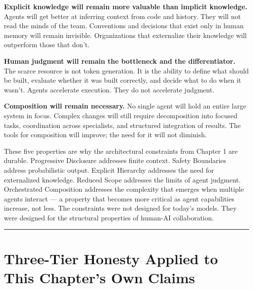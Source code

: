 \documentclass[
  a4paper,
  DIV=11,
  numbers=noendperiod]{scrreprt}
\begin{document}
\textbf{Explicit knowledge will remain more valuable than implicit
knowledge.} Agents will get better at inferring context from code and
history. They will not read the minds of the team. Conventions and
decisions that exist only in human memory will remain invisible.
Organizations that externalize their knowledge will outperform those
that don't.

\textbf{Human judgment will remain the bottleneck and the
differentiator.} The scarce resource is not token generation. It is the
ability to define what should be built, evaluate whether it was built
correctly, and decide what to do when it wasn't. Agents accelerate
execution. They do not accelerate judgment.

\textbf{Composition will remain necessary.} No single agent will hold an
entire large system in focus. Complex changes will still require
decomposition into focused tasks, coordination across specialists, and
structured integration of results. The tools for composition will
improve; the need for it will not diminish.

These five properties are why the architectural constraints from Chapter
1 are durable. Progressive Disclosure addresses finite context. Safety
Boundaries address probabilistic output. Explicit Hierarchy addresses
the need for externalized knowledge. Reduced Scope addresses the limits
of agent judgment. Orchestrated Composition addresses the complexity
that emerges when multiple agents interact --- a property that becomes
more critical as agent capabilities increase, not less. The constraints
were not designed for today's models. They were designed for the
structural properties of human-AI collaboration.

\begin{center}\rule{0.5\linewidth}{0.5pt}\end{center}

\section{Three-Tier Honesty Applied to This Chapter's Own
Claims}\label{three-tier-honesty-applied-to-this-chapters-own-claims}
\end{document}
